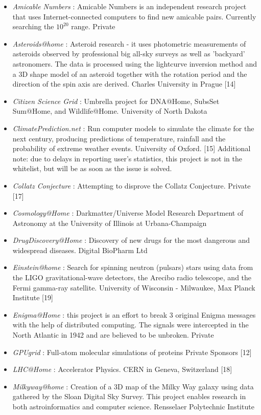 \begin{itemize}
	\item {\em Amicable Numbers} : Amicable Numbers is an independent research project that uses Internet-connected computers to find new amicable pairs. Currently searching the $10^{20}$ range.	Private	
	\item {\em Asteroids@home} : Asteroid research - it uses photometric measurements of asteroids observed by professional big all-sky surveys as well as 'backyard' astronomers. The data is processed using the lightcurve inversion method and a 3D shape model of an asteroid together with the rotation period and the direction of the spin axis are derived. Charles University in Prague [14]
	\item {\em Citizen Science Grid} : Umbrella project for DNA@Home, SubsSet Sum@Home, and Wildlife@Home. University of North Dakota
	\item {\em ClimatePrediction.net} : Run computer models to simulate the climate for the next century, producing predictions of temperature, rainfall and the probability of extreme weather events. University of Oxford. [15] Additional note: due to delays in reporting user's statistics, this project is not in the whitelist, but will be as soon as the issue is solved.
	\item {\em Collatz Conjecture} : Attempting to disprove the Collatz Conjecture.	Private	[17]	
	\item {\em Cosmology@Home} : Darkmatter/Universe Model Research	Department of Astronomy at the University of Illinois at Urbana-Champaign
	\item {\em DrugDiscovery@Home} : Discovery of new drugs for the most dangerous and widespread diseases.	Digital BioPharm Ltd
	\item {\em Einstein@home} : Search for spinning neutron (pulsars) stars using data from the LIGO gravitational-wave detectors, the Arecibo radio telescope, and the Fermi gamma-ray satellite.	University of Wisconsin - Milwaukee, Max Planck Institute [19]
	\item {\em Enigma@Home} : this project is an effort to break 3 original Enigma messages with the help of distributed computing. The signals were intercepted in the North Atlantic in 1942 and are believed to be unbroken.	Private	
	\item {\em GPUgrid} : Full-atom molecular simulations of proteins	Private Sponsors [12]
	\item {\em LHC@Home} : Accelerator Physics. CERN in Geneva, Switzerland [18]
	\item {\em Milkyway@home} : Creation of a 3D map of the Milky Way galaxy using data gathered by the Sloan Digital Sky Survey. This project enables research in both astroinformatics and computer science.	Rensselaer Polytechnic Institute

\end{itemize}
